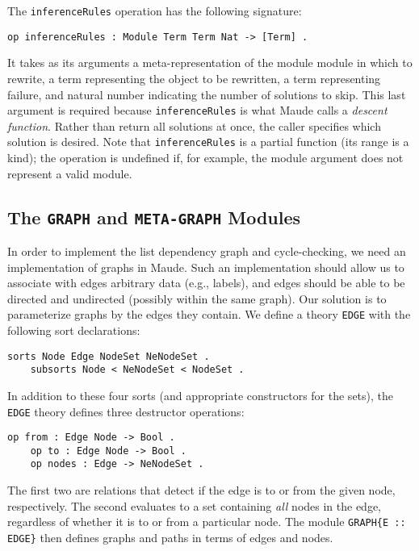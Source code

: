 \documentclass[11pt]{article}
\newcommand{\TitleListing}[1]{\texorpdfstring{\lstinline|#1|}{#1}}
\begin{document}
The \lstinline|inferenceRules| operation has the following signature:
\begin{lstlisting}[language=Maude, style=smalllisting]
    op inferenceRules : Module Term Term Nat -> [Term] .
\end{lstlisting}
It takes as its arguments a meta-representation of the module module in which
to rewrite, a term representing the object to be rewritten, a term representing
failure, and natural number indicating the number of solutions to skip. This
last argument is required because \lstinline|inferenceRules| is what Maude
calls a \emph{descent function}. Rather than return all solutions at once, the caller
specifies which solution is desired. Note that \lstinline|inferenceRules| is a
partial function (its range is a kind); the operation is undefined if, for
example, the module argument does not represent a valid module.

\subsection{The \TitleListing{GRAPH} and \TitleListing{META-GRAPH} Modules}
\label{subsection:graph-mod}

In order to implement the list dependency graph and cycle-checking, we need an
implementation of graphs in Maude. Such an implementation should allow us to
associate with edges arbitrary data (e.g., labels), and edges should be able to
be directed and undirected (possibly within the same graph). Our solution is to
parameterize graphs by the edges they contain. We define a theory
\lstinline|EDGE| with the following sort declarations:
\begin{lstlisting}[language=Maude, style=smalllisting]
    sorts Node Edge NodeSet NeNodeSet .
    subsorts Node < NeNodeSet < NodeSet .
\end{lstlisting}
In addition to these four sorts (and appropriate constructors for the sets),
the \lstinline|EDGE| theory defines three destructor operations:
\begin{lstlisting}[language=Maude, style=smalllisting]
    op from : Edge Node -> Bool .
    op to : Edge Node -> Bool .
    op nodes : Edge -> NeNodeSet .
\end{lstlisting}

The first two are relations that detect if the edge is to or from the given
node, respectively. The second evaluates to a set containing \emph{al{}l} nodes
in the edge, regardless of whether it is to or from a particular node.  The
module \lstinline|GRAPH{E :: EDGE}| then defines graphs and paths in terms of
edges and nodes.
\end{document}

